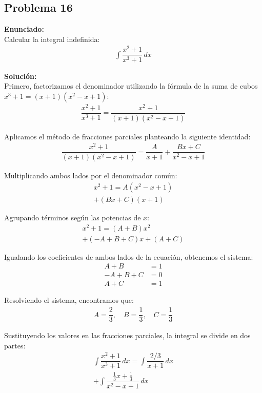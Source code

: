 \subsection*{Problema 16}

\noindent\textbf{Enunciado:} \\
Calcular la integral indefinida:
\begin{align*}
\int \dfrac{x^2 + 1}{x^3 + 1} \, dx
\end{align*}

\noindent\textbf{Solución:} \\
Primero, factorizamos el denominador utilizando la fórmula de la suma de cubos $x^3 + 1 = (x + 1)(x^2 - x + 1)$:
\begin{align*}
\dfrac{x^2 + 1}{x^3 + 1} = \dfrac{x^2 + 1}{(x + 1)(x^2 - x + 1)}
\end{align*}

Aplicamos el método de fracciones parciales planteando la siguiente identidad:
\begin{align*}
\dfrac{x^2 + 1}{(x + 1)(x^2 - x + 1)} = \dfrac{A}{x + 1} + \dfrac{Bx + C}{x^2 - x + 1}
\end{align*}

Multiplicando ambos lados por el denominador común:
\begin{align*}
x^2 + 1 = A(x^2 - x + 1) \\
+ (Bx + C)(x + 1)
\end{align*}

Agrupando términos según las potencias de $x$:
\begin{align*}
x^2 + 1 = (A + B)x^2 \\
+ (-A + B + C)x + (A + C)
\end{align*}

Igualando los coeficientes de ambos lados de la ecuación, obtenemos el sistema:
\begin{align*}
A + B &= 1 \\
-A + B + C &= 0 \\
A + C &= 1
\end{align*}

Resolviendo el sistema, encontramos que:
\begin{align*}
A = \dfrac{2}{3}, \quad B = \dfrac{1}{3}, \quad C = \dfrac{1}{3}
\end{align*}

Sustituyendo los valores en las fracciones parciales, la integral se divide en dos partes:
\begin{align*}
\int \dfrac{x^2 + 1}{x^3 + 1} \, dx = \int \dfrac{2/3}{x + 1} \, dx \\
+ \int \dfrac{\frac{1}{3}x + \frac{1}{3}}{x^2 - x + 1} \, dx
\end{align*}

